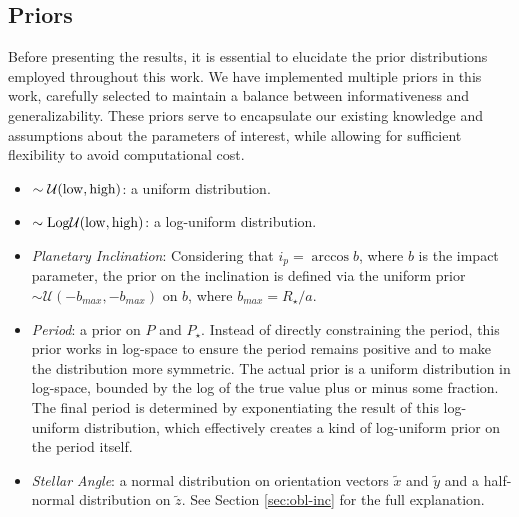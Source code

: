 \documentclass[twocolumn]{aastex631}
\begin{document}
\subsection{Priors}
Before presenting the results, it is essential to elucidate the prior distributions employed throughout this work. 
We have implemented multiple priors in this work, carefully selected to maintain a balance between informativeness and generalizability. 
These priors serve to encapsulate our existing knowledge and assumptions about the parameters of interest, while allowing for sufficient flexibility 
to avoid computational cost.
\begin{itemize}
    \item $\sim\mathcal{U}(\rm low, \rm high)$: a uniform distribution.
    \item $\sim \rm Log \mathcal{U}(\rm low, \rm high)$: a log-uniform distribution.
    \item \textit{Planetary Inclination}: Considering that $i_p=\arccos{b}$, where $b$ is the impact parameter,
    the prior on the inclination is defined via the uniform prior $\sim\mathcal{U}(-b_{max}, -b_{max})$ on $b$, where $b_{max} = R_{\star} / a$.
    \item \textit{Period}: a prior on $P$ and $P_{\star}$. Instead of directly constraining the period, this prior works in log-space to ensure the period 
    remains positive and to make the distribution more symmetric. The actual prior is a uniform distribution in log-space, bounded by the log of the true 
    value plus or minus some fraction. The final period is determined by exponentiating the result of this log-uniform distribution, 
    which effectively creates a kind of log-uniform prior on the period itself.
    \item \textit{Stellar Angle}: a normal distribution on orientation vectors $\tilde{x}$ and $\tilde{y}$ and a half-normal distribution on $\tilde{z}$. See Section
    \ref{sec:obl-inc} for the full explanation.
\end{itemize}
\end{document}
